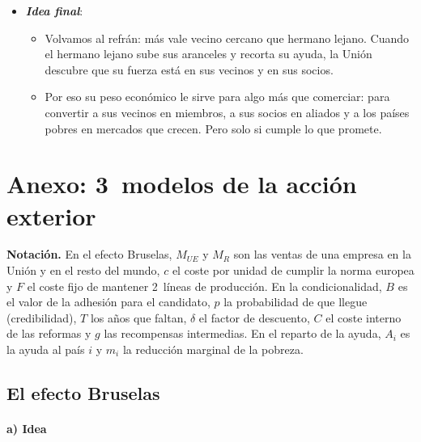 \documentclass[11pt]{article}
\begin{document}
\begin{itemize}
\begin{itemize}
  \item Su mejor política exterior ha sido la ampliación, y la de esta década (Ucrania, Moldavia y los Balcanes) exige que la Unión se reforme para recibirlos.
  \end{itemize}
\item \textbf{\emph{Idea final}}:
  \begin{itemize}
  \item Volvamos al refrán: más vale vecino cercano que hermano lejano. Cuando el hermano lejano sube sus aranceles y recorta su ayuda, la Unión descubre que su fuerza está en sus vecinos y en sus socios.
  \item Por eso su peso económico le sirve para algo más que comerciar: para convertir a sus vecinos en miembros, a sus socios en aliados y a los países pobres en mercados que crecen. Pero solo si cumple lo que promete.
  \end{itemize}
\end{itemize}

\clearpage
\appendix

\section{Anexo: 3~modelos de la acción exterior}\label{anexo:modelos}

\begin{anotaciones}
\textbf{Notación.} En el efecto Bruselas, $M_{UE}$ y $M_R$ son las ventas de una empresa en la Unión y en el resto del mundo, $c$ el coste por unidad de cumplir la norma europea y $F$ el coste fijo de mantener 2~líneas de producción. En la condicionalidad, $B$ es el valor de la adhesión para el candidato, $p$ la probabilidad de que llegue (credibilidad), $T$ los años que faltan, $\delta$ el factor de descuento, $C$ el coste interno de las reformas y $g$ las recompensas intermedias. En el reparto de la ayuda, $A_i$ es la ayuda al país $i$ y $m_i$ la reducción marginal de la pobreza.
\end{anotaciones}

\subsection{El efecto Bruselas}\label{anexo:bruselas}

\paragraph{a) Idea}
\end{document}
